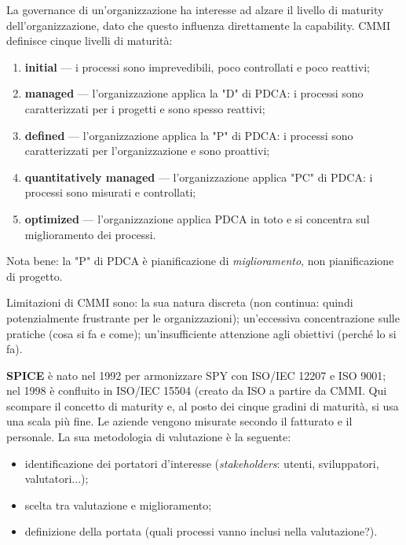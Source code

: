 \documentclass[a4paper]{article}
\begin{document}
La governance di un'organizzazione ha interesse ad alzare il livello di maturity dell'organizzazione, dato che questo influenza direttamente la capability. CMMI definisce cinque livelli di maturità:
		
	\begin{enumerate}
		
			
	\item \textbf{initial} --- i processi sono imprevedibili, poco controllati e poco reattivi;
			
	\item \textbf{managed} --- l'organizzazione applica la "D" di PDCA: i processi sono caratterizzati per i progetti e sono spesso reattivi;
			
	\item \textbf{defined} --- l'organizzazione applica la "P" di PDCA: i processi sono caratterizzati per l'organizzazione e sono proattivi;
			
	\item \textbf{quantitatively managed} --- l'organizzazione applica "PC" di PDCA: i processi sono misurati e controllati;
			
	\item \textbf{optimized} --- l'organizzazione applica PDCA in toto e si concentra sul miglioramento dei processi.
		
	\end{enumerate}

		
Nota bene: la "P" di PDCA è pianificazione di \emph{miglioramento}, non pianificazione di progetto.
		
Limitazioni di CMMI sono: la sua natura discreta (non continua: quindi potenzialmente frustrante per le organizzazioni); un'eccessiva concentrazione sulle pratiche (cosa si fa e come); un'insufficiente attenzione agli obiettivi (perché lo si fa).
		
\textbf{SPICE} è nato nel 1992 per armonizzare SPY con ISO/IEC 12207 e ISO 9001; nel 1998 è confluito in ISO/IEC 15504 (creato da ISO a partire da CMMI. Qui scompare il concetto di maturity e, al posto dei cinque gradini di maturità, si usa una scala più fine. Le aziende vengono misurate secondo il fatturato e il personale. La sua metodologia di valutazione è la seguente:
		
	\begin{itemize}
		
			
	\item identificazione dei portatori d'interesse (\emph{stakeholders}: utenti, sviluppatori, valutatori...);
			
	\item scelta tra valutazione e miglioramento;%

			
	\item definizione della portata (quali processi vanno inclusi nella valutazione?).
		
	\end{itemize}
\end{document}
